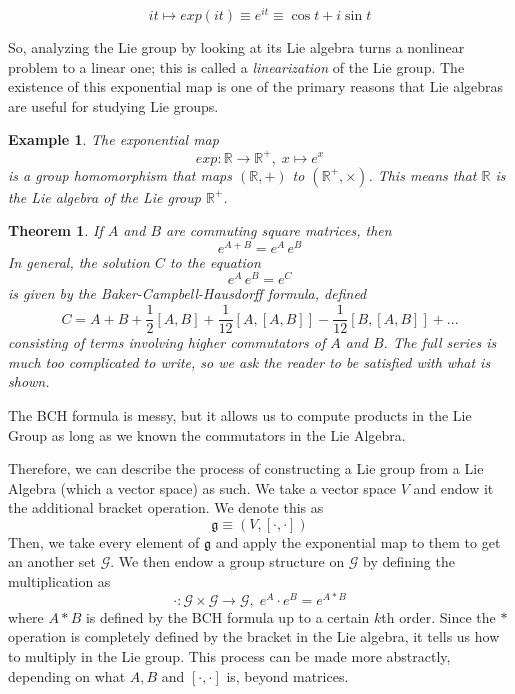 \documentclass{article}
\newtheorem{theorem}{Theorem}[section]
\newtheorem{example}{Example}[section]
\theoremstyle{remark}
\theoremstyle{definition}
\begin{document}
\[i t \mapsto exp(it) \equiv e^{it} \equiv \cos{t} + i \sin{t}\]
\begin{center}
\end{center}
So, analyzing the Lie group by looking at its Lie algebra turns a nonlinear problem to a linear one; this is called a \textit{linearization} of the Lie group. The existence of this exponential map is one of the primary reasons that Lie algebras are useful for studying Lie groups. 
\begin{example}
The exponential map 
\[exp: \mathbb{R} \longrightarrow \mathbb{R}^+, \; x \mapsto e^x\]
is a group homomorphism that maps $(\mathbb{R}, +)$ to $(\mathbb{R}^+, \times)$. This means that $\mathbb{R}$ is the Lie algebra of the Lie group $\mathbb{R}^+$. 
\end{example}

\begin{theorem}
If $A$ and $B$ are commuting square matrices, then 
\[e^{A + B} = e^A \, e^B\]
In general, the solution $C$ to the equation
\[e^{A} \, e^B = e^C\]
is given by the \textit{Baker-Campbell-Hausdorff formula}, defined
\[C = A + B + \frac{1}{2}[A,B] + \frac{1}{12} [A,[A,B]] - \frac{1}{12} [B,[A,B]] + ...\]
consisting of terms involving higher commutators of $A$ and $B$. The full series is much too complicated to write, so we ask the reader to be satisfied with what is shown. 
\end{theorem}
The BCH formula is messy, but it allows us to compute products in the Lie Group as long as we known the commutators in the Lie Algebra. 

Therefore, we can describe the process of constructing a Lie group from a Lie Algebra (which a vector space) as such. We take a vector space $V$ and endow it the additional bracket operation. We denote this as
\[\mathfrak{g} \equiv (V, [\cdot, \cdot])\]
Then, we take every element of $\mathfrak{g}$ and apply the exponential map to them to get an another set $\mathcal{G}$. We then endow a group structure on $\mathcal{G}$ by defining the multiplication as 
\[\cdot: \mathcal{G} \times \mathcal{G} \longrightarrow \mathcal{G}, \; e^A \cdot e^B = e^{A * B}\]
where $A*B$ is defined by the BCH formula up to a certain $k$th order. Since the $*$ operation is completely defined by the bracket in the Lie algebra, it tells us how to multiply in the Lie group. This process can be made more abstractly, depending on what $A, B$ and $[\cdot,\cdot]$ is, beyond matrices. 
\end{document}
